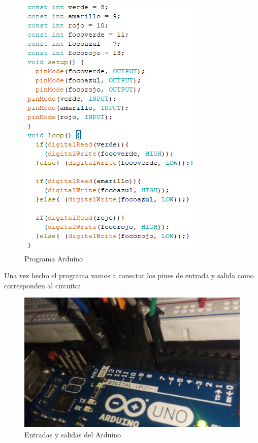\documentclass[12pt,a4paper]{article}
\begin{document}
\begin{figure}[hbtp]
\centering
\includegraphics[scale=0.8]{Circuito/Arduino.png}
\caption{Programa Arduino}
\end{figure}

Una vez hecho el programa vamos a conectar los pines de entrada y salida como corresponden al circuito: 
\begin{figure}[hbtp]
\centering
\includegraphics[scale=0.25]{Circuito/Arduino.jpeg}
\caption{Entradas y salidas del Arduino}
\end{figure}
\end{document}
